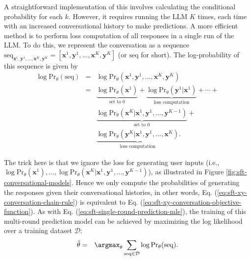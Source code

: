 A straightforward implementation of this involves calculating the conditional probability for each $k$. However, it requires running the LLM $K$ times, each time with an increased conversational history to make predictions. A more efficient method is to perform loss computation of all responses in a single run of the LLM. To do this, we represent the conversation as a sequence $\mathrm{seq}_{\mathbf{x}^1,\mathbf{y}^1,...,\mathbf{x}^K,\mathbf{y}^K} = [\mathbf{x}^1,\mathbf{y}^1,...,\mathbf{x}^K,\mathbf{y}^K]$ (or $\mathrm{seq}$ for short). The log-probability of this sequence is given by
\begin{eqnarray}
\log \mathrm{Pr}_{\theta}(\mathrm{seq}) & = & \log \mathrm{Pr}_{\theta}(\mathbf{x}^1,\mathbf{y}^1,...,\mathbf{x}^K,\mathbf{y}^K) \nonumber \\
                                        & = & \underbrace{\log \mathrm{Pr}_{\theta}(\mathbf{x}^1)}_{\text{set to $0$}} + \underbrace{\log \mathrm{Pr}_{\theta}(\mathbf{y}^1|\mathbf{x}^1)}_{\text{loss computation}} + \cdots + \nonumber \\
                                        &   & \underbrace{\log \mathrm{Pr}_{\theta}(\mathbf{x}^K|\mathbf{x}^1,\mathbf{y}^1,...,\mathbf{y}^{K-1})}_{\text{set to $0$}} + \nonumber \\
                                        &   & \underbrace{\log \mathrm{Pr}_{\theta}(\mathbf{y}^K|\mathbf{x}^1,\mathbf{y}^1,...,\mathbf{x}^K)}_{\text{loss computation}}. \label{eq:sft-xy-conversation-chain-rule}
\end{eqnarray}

The trick here is that we ignore the loss for generating user inputs (i.e., $\log \mathrm{Pr}_{\theta}(\mathbf{x}^1),...,\allowbreak \log \mathrm{Pr}_{\theta}(\mathbf{x}^K|\mathbf{x}^1,\mathbf{y}^1,...,\mathbf{y}^{K-1})$), as illustrated in Figure \ref{fig:sft-conversational-models}. Hence we only compute the probabilities of generating the responses given their conversational histories, in other words, Eq. (\ref{eq:sft-xy-conversation-chain-rule}) is equivalent to Eq. (\ref{eq:sft-xy-conversation-objective-function}). As with Eq. (\ref{eq:sft-single-round-prediction-mle}), the training of this multi-round prediction model can be achieved by maximizing the log likelihood over a training dataset $\mathcal{D}$:
\begin{eqnarray}
\tilde{\theta} & = & \argmax_{\theta} \sum_{\mathrm{seq} \in \mathcal{D}} \log \mathrm{Pr}_{\theta}(\mathrm{seq}).
\end{eqnarray}

